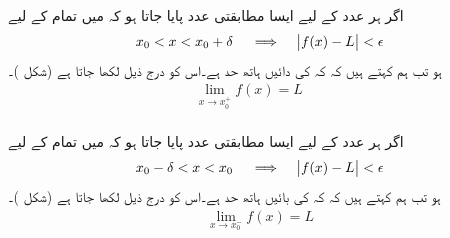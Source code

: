 \\
اگر ہر عدد  کے لیے ایسا مطابقتی عدد  پایا جاتا ہو کہ  میں  تمام  کے لیے
\begin{align}\label{مساوات_حد_دائیں_ہاتھ_حد}
x_0<x<x_0+\delta\quad \implies \quad \abs{f(x)-L}<\epsilon
\end{align}
ہو تب ہم کہتے ہیں کہ کہ  کی  دائیں ہاتھ حد  ہے۔اس کو درج ذیل لکھا جاتا ہے  (شکل )۔
\begin{align*}
\lim_{x\to x_0^+} f(x)=L &&
\end{align*}
\\
اگر ہر عدد  کے لیے ایسا مطابقتی عدد  پایا جاتا ہو کہ  میں  تمام  کے لیے
\begin{align}\label{مساوات_حد_بائیں_ہاتھ_حد}
x_0-\delta<x<x_0\quad \implies \quad \abs{f(x)-L}<\epsilon
\end{align}
ہو تب ہم کہتے ہیں کہ کہ  کی بائیں ہاتھ حد  ہے۔اس کو درج ذیل لکھا جاتا ہے (شکل )۔
\begin{align*}
\lim_{x\to x_0^-} f(x)=L
\end{align*}
%
